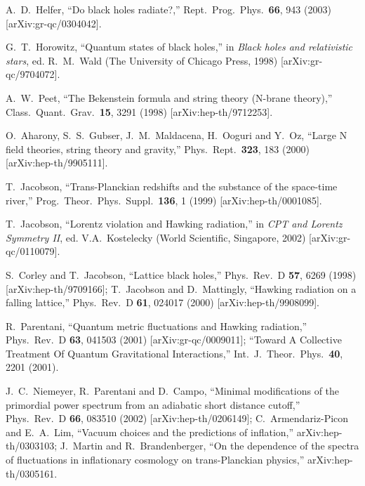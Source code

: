 \documentclass[12pt]{article}
\begin{document}
\begin{thebibliography}{99}
A.~D.~Helfer,
``Do black holes radiate?,''
Rept.\ Prog.\ Phys.\  {\bf 66}, 943 (2003)
[arXiv:gr-qc/0304042].

G.~T.~Horowitz,
``Quantum states of black holes,''
in {\it Black holes and relativistic stars}, ed.
R.~M.~Wald (The University of Chicago Press, 1998)
[arXiv:gr-qc/9704072].

A.~W.~Peet,
``The Bekenstein formula and string theory (N-brane theory),''
Class.\ Quant.\ Grav.\  {\bf 15}, 3291 (1998)
[arXiv:hep-th/9712253].

O.~Aharony, S.~S.~Gubser, J.~M.~Maldacena, H.~Ooguri and Y.~Oz,
``Large N field theories, string theory and gravity,''
Phys.\ Rept.\  {\bf 323}, 183 (2000)
[arXiv:hep-th/9905111].

T.~Jacobson,
``Trans-Planckian redshifts and the substance of the space-time river,''
Prog.\ Theor.\ Phys.\ Suppl.\  {\bf 136}, 1 (1999)
[arXiv:hep-th/0001085].

T.~Jacobson,
``Lorentz violation and Hawking radiation,''
in {\it CPT and Lorentz Symmetry II}, ed. V.A.~Kostelecky
(World Scientific, Singapore, 2002) [arXiv:gr-qc/0110079].

S.~Corley and T.~Jacobson,
``Lattice black holes,''
Phys.\ Rev.\ D {\bf 57}, 6269 (1998)
[arXiv:hep-th/9709166];
T.~Jacobson and D.~Mattingly,
``Hawking radiation on a falling lattice,''
Phys.\ Rev.\ D {\bf 61}, 024017 (2000)
[arXiv:hep-th/9908099].

R.~Parentani,
``Quantum metric fluctuations and Hawking radiation,''
Phys.\ Rev.\ D {\bf 63}, 041503 (2001)
[arXiv:gr-qc/0009011];
``Toward A Collective Treatment Of Quantum Gravitational Interactions,''
Int.\ J.\ Theor.\ Phys.\  {\bf 40}, 2201 (2001).

J.~C.~Niemeyer, R.~Parentani and D.~Campo,
``Minimal modifications of the primordial power spectrum from an  adiabatic short distance cutoff,''
Phys.\ Rev.\ D {\bf 66}, 083510 (2002)
[arXiv:hep-th/0206149];
C.~Armendariz-Picon and E.~A.~Lim,
``Vacuum choices and the predictions of inflation,''
arXiv:hep-th/0303103;
J.~Martin and R.~Brandenberger,
``On the dependence of the spectra of fluctuations in inflationary  cosmology on trans-Planckian physics,''
arXiv:hep-th/0305161.


\end{thebibliography}
\end{document}
